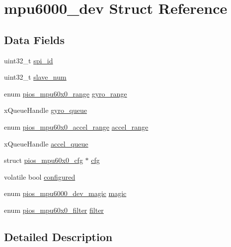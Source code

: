 \hypertarget{structmpu6000__dev}{\section{mpu6000\-\_\-dev \-Struct \-Reference}
\label{structmpu6000__dev}
}
\subsection*{\-Data \-Fields}
\begin{DoxyCompactItemize}
\item 
uint32\-\_\-t \hyperlink{structmpu6000__dev_a7409608d24410d4ef980f9c05085bdb5}{spi\-\_\-id}
\item 
uint32\-\_\-t \hyperlink{structmpu6000__dev_a2b1869dd86c392ccfe9a0cd881a3b4a7}{slave\-\_\-num}
\item 
enum \hyperlink{group___p_i_o_s___m_p_u60_x0_ga56700b0154a14cf67c9f8f44a86ad9c0}{pios\-\_\-mpu60x0\-\_\-range} \hyperlink{structmpu6000__dev_a0d330b8cdca1d01d4b5eecd21bba78f6}{gyro\-\_\-range}
\item 
x\-Queue\-Handle \hyperlink{structmpu6000__dev_a356a86d4ad42dd2daecb5e255cc5f7ce}{gyro\-\_\-queue}
\item 
enum \hyperlink{group___p_i_o_s___m_p_u60_x0_ga8f297bddae3eb43bbf7b54abc6494992}{pios\-\_\-mpu60x0\-\_\-accel\-\_\-range} \hyperlink{structmpu6000__dev_a97c53e87c85ad8b04916492833bedadb}{accel\-\_\-range}
\item 
x\-Queue\-Handle \hyperlink{structmpu6000__dev_aab5a85c354860f95eabe5fdaac73504a}{accel\-\_\-queue}
\item 
struct \hyperlink{structpios__mpu60x0__cfg}{pios\-\_\-mpu60x0\-\_\-cfg} $\ast$ \hyperlink{structmpu6000__dev_a4a8e8aa9b09f9ce6dcb417ff154282bc}{cfg}
\item 
volatile bool \hyperlink{structmpu6000__dev_a235cf7e1cc85cf6707100027c483894a}{configured}
\item 
enum \hyperlink{group___p_i_o_s___m_p_u6000_gacec1373b8d76d996eacbadde2698c1ee}{pios\-\_\-mpu6000\-\_\-dev\-\_\-magic} \hyperlink{structmpu6000__dev_a11582fec1335a7b8e45979545ce7191b}{magic}
\item 
enum \hyperlink{group___p_i_o_s___m_p_u60_x0_gacce1988bc994f5ade6ac748c2bf0b924}{pios\-\_\-mpu60x0\-\_\-filter} \hyperlink{structmpu6000__dev_ad8507301bf86feb8f18211ddb353f332}{filter}
\end{DoxyCompactItemize}


\subsection{\-Detailed \-Description}


